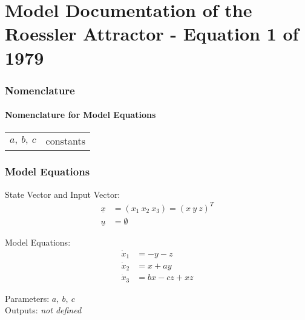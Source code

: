 \documentclass[10pt,a4paper]{article}
\begin{document}
	\part*{Model Documentation of the \\ Roessler Attractor - Equation 1 of 1979} %
	
	
	
	
	\section{Nomenclature} %
	\subsection{Nomenclature for Model Equations} %
	
	\begin{tabular}{ll}
		$a,~b,~c$ & constants		
	\end{tabular}
	
	
	\section{Model Equations} %
	
	State Vector and Input Vector:
	\begin{align*}
		\underline{x} &= (x_1 \ x_2 \ x_3) = (x \ y \ z)^T \\
		\underline{u} &= \emptyset
	\end{align*}
	
	\noindent Model Equations:
	\begin{subequations}
	\begin{align}
		\dot{x}_1 &= - y - z	\\
		\dot{x}_2 &= x + ay \\
		\dot{x}_3 &= bx - cz + xz    
	\end{align}
	\end{subequations}

	\noindent
	Parameters: $a, \ b, \ c$ %
	\\
	Outputs:  \textit{\textlangle not defined\textrangle}
	
\end{document}
